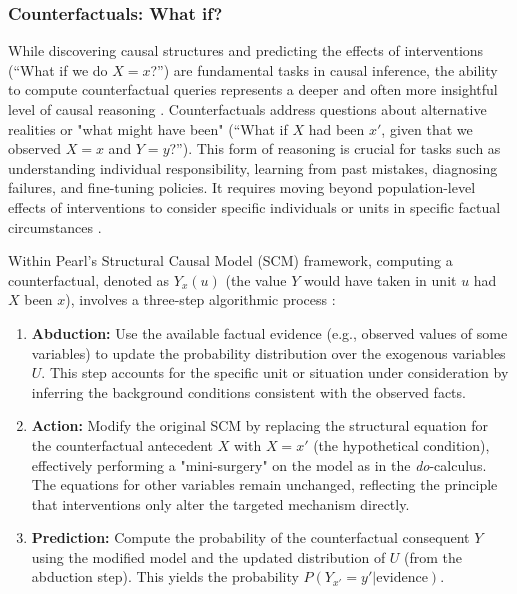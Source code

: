 {\newpage

\subsubsection{Counterfactuals: What if?}
\label{subsec:counterfactuals}

While discovering causal structures and predicting the effects of interventions (``What if we do $X=x$?'') are fundamental tasks in causal inference, the ability to compute counterfactual queries represents a deeper and often more insightful level of causal reasoning \cite{Pearl2009Causality}. Counterfactuals address questions about alternative realities or "what might have been" (``What if $X$ had been $x'$, given that we observed $X=x$ and $Y=y$?''). This form of reasoning is crucial for tasks such as understanding individual responsibility, learning from past mistakes, diagnosing failures, and fine-tuning policies. It requires moving beyond population-level effects of interventions to consider specific individuals or units in specific factual circumstances \cite{Pearl2009Causality, Balke1994Probabilistic}.

Within Pearl's Structural Causal Model (SCM) framework, computing a counterfactual, denoted as $Y_x(u)$ (the value $Y$ would have taken in unit $u$ had $X$ been $x$), involves a three-step algorithmic process \cite{Pearl2009Causality}:
\begin{enumerate}
    \item \textbf{Abduction:} Use the available factual evidence (e.g., observed values of some variables) to update the probability distribution over the exogenous variables $U$. This step accounts for the specific unit or situation under consideration by inferring the background conditions consistent with the observed facts.
    \item \textbf{Action:} Modify the original SCM by replacing the structural equation for the counterfactual antecedent $X$ with $X=x'$ (the hypothetical condition), effectively performing a "mini-surgery" on the model as in the \textit{do}-calculus. The equations for other variables remain unchanged, reflecting the principle that interventions only alter the targeted mechanism directly.
    \item \textbf{Prediction:} Compute the probability of the counterfactual consequent $Y$ using the modified model and the updated distribution of $U$ (from the abduction step). This yields the probability $P(Y_{x'} = y' | \text{evidence})$.
\end{enumerate}

}
